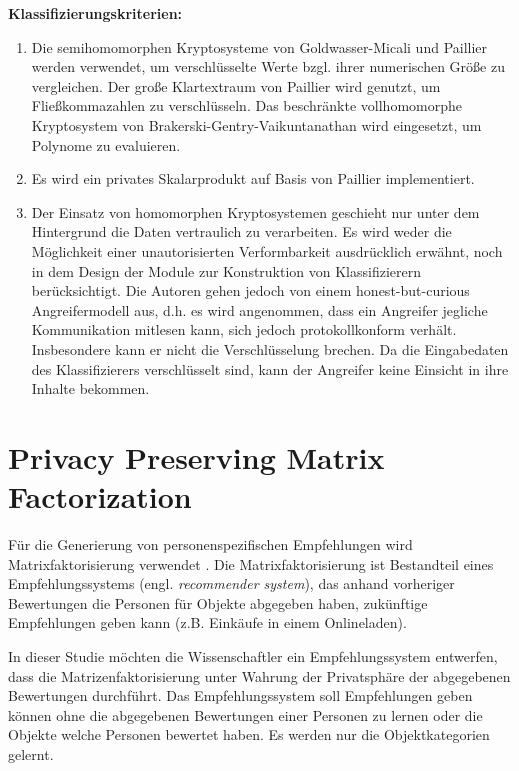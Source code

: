 \textbf{Klassifizierungskriterien:}
\begin{enumerate}
	\item Die semihomomorphen Kryptosysteme von Goldwasser-Micali und Paillier werden verwendet, um verschlüsselte Werte bzgl. ihrer numerischen Größe zu vergleichen. Der große Klartextraum von Paillier wird genutzt, um Fließkommazahlen zu verschlüsseln. Das beschränkte vollhomomorphe Kryptosystem von Brakerski-Gentry-Vaikuntanathan wird eingesetzt, um Polynome zu evaluieren.
	\item Es wird ein privates Skalarprodukt auf Basis von Paillier implementiert.
	\item Der Einsatz von homomorphen Kryptosystemen geschieht nur unter dem Hintergrund die Daten vertraulich zu verarbeiten. Es wird weder die Möglichkeit einer unautorisierten Verformbarkeit ausdrücklich erwähnt, noch in dem Design der Module zur Konstruktion von Klassifizierern berücksichtigt. Die Autoren gehen jedoch von einem honest-but-curious Angreifermodell aus, d.h. es wird angenommen, dass ein Angreifer jegliche Kommunikation mitlesen kann, sich jedoch protokollkonform verhält. Insbesondere kann er nicht die Verschlüsselung brechen. Da die Eingabedaten des Klassifizierers verschlüsselt sind, kann der Angreifer keine Einsicht in ihre Inhalte bekommen.
	\end{enumerate}

\section{Privacy Preserving Matrix Factorization \cite{nikolaenko2013privacy}}
\label{PPMF}
Für die Generierung von personenspezifischen Empfehlungen wird Matrixfaktorisierung verwendet \cite{koren2009matrix}. Die Matrixfaktorisierung ist Bestandteil eines Empfehlungssystems (engl. \textit{recommender system}), das anhand vorheriger Bewertungen die Personen für Objekte abgegeben haben, zukünftige Empfehlungen geben kann (z.B. Einkäufe in einem Onlineladen).

In dieser Studie möchten die Wissenschaftler ein Empfehlungssystem entwerfen, dass die Matrizenfaktorisierung unter Wahrung der Privatsphäre der abgegebenen Bewertungen durchführt. Das Empfehlungssystem soll Empfehlungen geben können ohne die abgegebenen Bewertungen einer Personen zu lernen oder die Objekte welche Personen bewertet haben. Es werden nur die Objektkategorien  gelernt.

